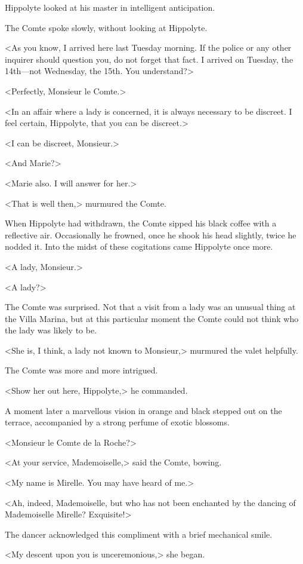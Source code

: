 Hippolyte looked at his master in intelligent anticipation.

The Comte spoke slowly, without looking at Hippolyte.

<As you know, I arrived here last Tuesday morning. If the police or any other inquirer should question you, do not forget that fact. I arrived on Tuesday, the 14th—not Wednesday, the 15th. You understand?>

<Perfectly, Monsieur le Comte.>

<In an affair where a lady is concerned, it is always necessary to be discreet. I feel certain, Hippolyte, that you can be discreet.>

<I can be discreet, Monsieur.>

<And Marie?>

<Marie also. I will answer for her.>

<That is well then,> murmured the Comte.

When Hippolyte had withdrawn, the Comte sipped his black coffee with a reflective air. Occasionally he frowned, once he shook his head slightly, twice he nodded it. Into the midst of these cogitations came Hippolyte once more.

<A lady, Monsieur.>

<A lady?>

The Comte was surprised. Not that a visit from a lady was an unusual thing at the Villa Marina, but at this particular moment the Comte could not think who the lady was likely to be.

<She is, I think, a lady not known to Monsieur,> murmured the valet helpfully.

The Comte was more and more intrigued.

<Show her out here, Hippolyte,> he commanded.

A moment later a marvellous vision in orange and black stepped out on the terrace, accompanied by a strong perfume of exotic blossoms.

<Monsieur le Comte de la Roche?>

<At your service, Mademoiselle,> said the Comte, bowing.

<My name is Mirelle. You may have heard of me.>

<Ah, indeed, Mademoiselle, but who has not been enchanted by the dancing of Mademoiselle Mirelle? Exquisite!>

The dancer acknowledged this compliment with a brief mechanical smile.

<My descent upon you is unceremonious,> she began.

